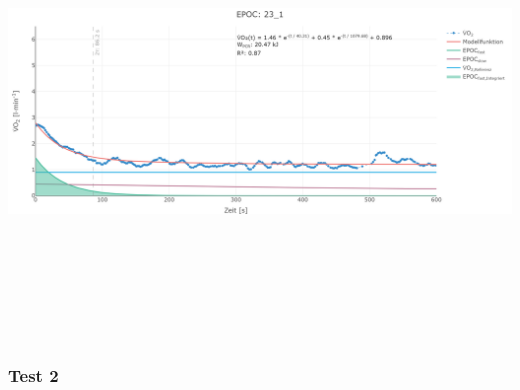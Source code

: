\documentclass[
  letterpaper,
  DIV=11]{scrartcl}
\begin{document}
\includegraphics[width=11.45833in,height=4.6875in]{images/23_1.png}

\subsubsection{Test 2}
\end{document}
